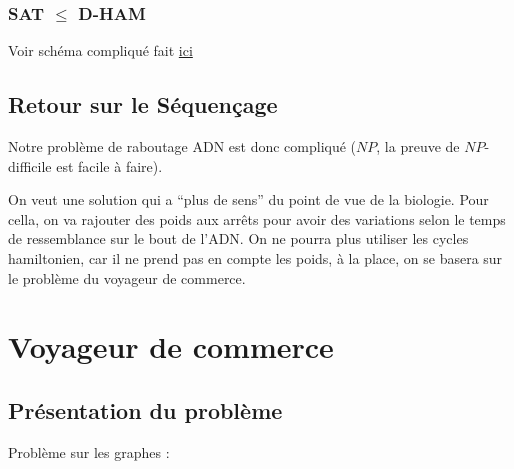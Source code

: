 \documentclass{article}
\theoremstyle{plain}
\begin{document}
      \subsubsection{SAT $\leq$ D-HAM}

        Voir schéma compliqué fait
        \href{https://gitlab.com/valoranM/latex_diagram/-/blob/main/Problem_reduction/Sat_to_Hamming/ham.pdf?ref_type=heads}{ici}

    \subsection{Retour sur le Séquençage}

      Notre problème de raboutage ADN est donc compliqué ($NP$, la preuve de
      $NP$-difficile est facile à faire).

      On veut une solution qui a ``plus de sens'' du point de vue de la
      biologie. Pour cella, on va rajouter des poids aux arrêts pour avoir des
      variations selon le temps de ressemblance sur le bout de l'ADN. On ne
      pourra plus utiliser les cycles hamiltonien, car il ne prend pas en compte
      les poids, à la place, on se basera sur le problème du voyageur de
      commerce.

  \section{Voyageur de commerce}

    \subsection{Présentation du problème}

      Problème sur les graphes :

\end{document}
